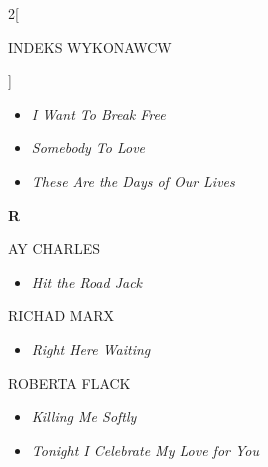 \documentclass[a4paper]{report}
\begin{document}
\begin{multicols*}{2}[\begin{Huge}INDEKS WYKONAWCW\end{Huge}\vspace{1cm}]
\begin{minipage}{\columnwidth}
\begin{itemize}[topsep=3pt, after=\vspace{1.5mm}]
	\end{itemize}
\end{minipage}
\begin{minipage}{\columnwidth}
	\begin{itemize}[topsep=3pt, after=\vspace{1.5mm}]
		\itemsep0em
		\item[]  \textit{I Want To Break Free}  \\
	\end{itemize}
\end{minipage}
\begin{minipage}{\columnwidth}
	\begin{itemize}[topsep=3pt, after=\vspace{3mm}]
		\itemsep0em
		\item[]  \textit{Somebody To Love}  \\
		\item[]  \textit{These Are the Days of Our Lives}  \\
	\end{itemize}
\end{minipage}
\begin{minipage}{\columnwidth}
	\begin{Large}\textbf{R}\end{Large}AY CHARLES 
	\begin{itemize}[topsep=3pt, after=\vspace{3mm}]
		\itemsep0em
		\item[]\textit{Hit the Road Jack}  \\
	\end{itemize}
\end{minipage}
\begin{minipage}{\columnwidth}
	RICHAD MARX 
	\begin{itemize}[topsep=3pt, after=\vspace{3mm}]
		\itemsep0em
		\item[]\textit{Right Here Waiting}  \\
	\end{itemize}
\end{minipage}
\begin{minipage}{\columnwidth}
	ROBERTA FLACK 
	\begin{itemize}[topsep=3pt, after=\vspace{3mm}]
		\itemsep0em
		\item[]\textit{Killing Me Softly}  \\
		\item[]  \textit{Tonight I Celebrate My Love for You}  \\

\end{itemize}
\end{minipage}
\end{multicols*}
\end{document}
